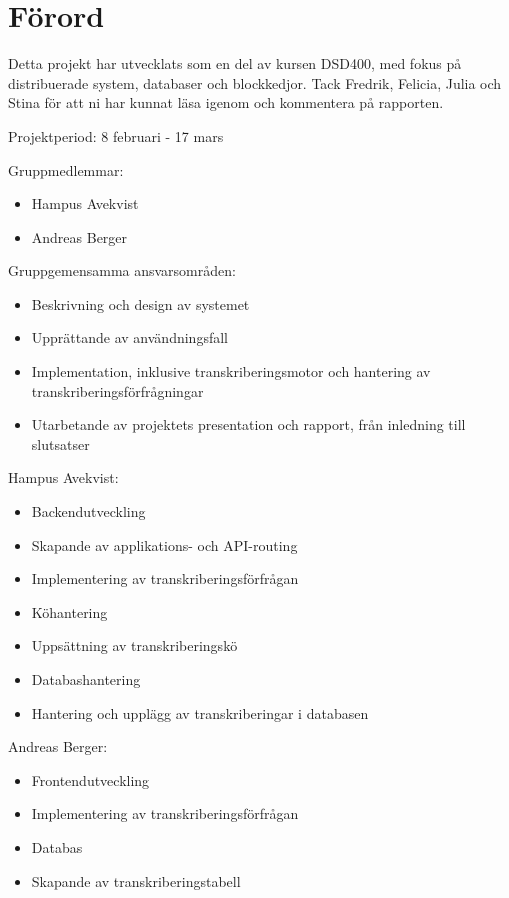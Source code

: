 \thispagestyle{plain}

\section{Förord}
Detta projekt har utvecklats som en del av kursen DSD400, med fokus på
distribuerade system, databaser och blockkedjor. Tack Fredrik, Felicia, Julia
och Stina för att ni har kunnat läsa igenom och kommentera på rapporten.

Projektperiod: 8 februari - 17 mars

Gruppmedlemmar:
\begin{itemize}
    \item Hampus Avekvist
    \item Andreas Berger
\end{itemize}

Gruppgemensamma ansvarsområden:
\begin{itemize}
    \item Beskrivning och design av systemet
    \item Upprättande av användningsfall
    \item Implementation, inklusive transkriberingsmotor och hantering av transkriberingsförfrågningar
    \item Utarbetande av projektets presentation och rapport, från inledning till slutsatser
\end{itemize}

Hampus Avekvist:
\begin{itemize}
    \item Backendutveckling
    \item Skapande av applikations- och API-routing
    \item Implementering av transkriberingsförfrågan
    \item Köhantering
    \item Uppsättning av transkriberingskö
    \item Databashantering
    \item Hantering och upplägg av transkriberingar i databasen
\end{itemize}

Andreas Berger:
\begin{itemize}
    \item Frontendutveckling
    \item Implementering av transkriberingsförfrågan
    \item Databas
    \item Skapande av transkriberingstabell
\end{itemize}
